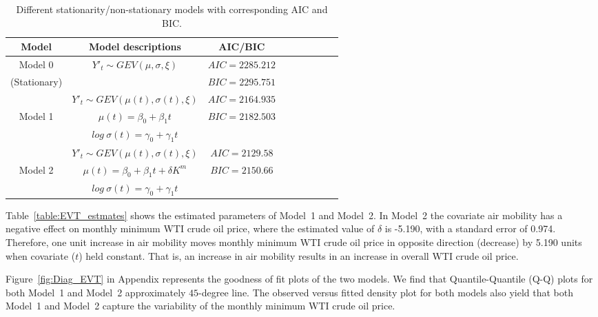 \documentclass[review]{elsarticle}
\begin{document}
\begin{table*}[!ht]
	\caption{Different 	stationarity/non-stationary models with corresponding AIC and BIC.}
	\label{table:GEVmodels}	
	\centering
	\begin{tabular}{c|c|*{6}{c}r}  
		
		Model  &   Model descriptions  &  AIC/BIC   \\
		\hline

		Model 0 &  $Y'_t \sim GEV(\mu, \sigma, \xi)$ & $AIC = 2285.212$\\
		(Stationary) &    & $BIC = 2295.751$  \\



		\hline	
	 &  $Y'_t \sim GEV(\mu (t), \sigma (t), \xi)$  &  $AIC=2164.935$ \\
	Model 1	&    $\mu(t)=\beta_0 + \beta_1 t$   &  $BIC = 2182.503$  \\
		&    $log~\sigma(t)= \gamma_0 + \gamma_1 t$  &  \\
		
				\hline
		 &   $Y'_t \sim GEV(\mu (t), \sigma(t), \xi)$ & $AIC = 2129.58$ \\
		Model 2 &    $\mu(t)=\beta_0 + \beta_1 t + \delta K^m$  & $BIC = 2150.66$  \\
		&    $ log~\sigma(t)= \gamma_0 + \gamma_1 t$ & \\
		\hline
		
		\hline
	\end{tabular}
\end{table*}
Table~\ref{table:EVT_estmates} shows the estimated parameters of Model~1 and Model~2. In Model~2 the covariate air mobility has a negative effect on monthly minimum WTI crude oil price, where the estimated value of  $\delta$ is -5.190, with a standard error of 0.974.
Therefore, one unit increase in air mobility moves monthly minimum WTI crude oil price in opposite direction (decrease) by 5.190 units when covariate ($t$) held constant. That is, an increase in air mobility results in an increase in overall WTI crude oil price.

Figure~\ref{fig:Diag_EVT} in Appendix represents the goodness of fit plots of the two models. We find that Quantile-Quantile (Q-Q) plots for both Model~1 and Model~2 approximately $45$-degree line. The observed versus fitted density plot for both models also yield that both Model~1 and Model~2 capture the variability of the monthly minimum WTI crude oil price.
\end{document}
